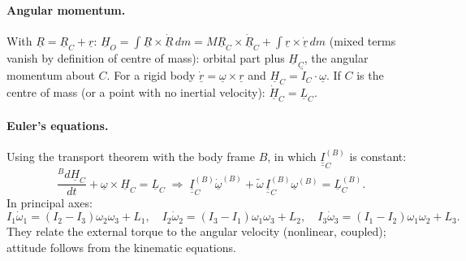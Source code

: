 \paragraph{Angular momentum.} With $\underline R=\underline R_C+\underline r$: $\underline H_O=\int\underline R\times\dot{\underline R}\,dm=M\underline R_C\times\dot{\underline R}_C+\int\underline r\times\dot{\underline r}\,dm$
(mixed terms vanish by definition of centre of mass): orbital part plus $\underline H_C$, the angular momentum about $C$. For a rigid body
$\dot{\underline r}=\underline\omega\times\underline r$ and $\underline H_C=\underrightarrow I_C\cdot\underline\omega$. If $C$ is the centre of mass (or a point with no inertial
velocity): $\dot{\underline H}_C=\underline L_C$.
\paragraph{Euler's equations.} Using the transport theorem with the body frame $B$, in which $\underline{\underline I}_C^{(B)}$ is constant:
\begin{equation}
\frac{{}^Bd\underline H_C}{dt}+\underline\omega\times\underline H_C=\underline L_C
\;\Longrightarrow\;
\underline{\underline I}_C^{(B)}\dot{\underline\omega}^{(B)}+\tilde\omega\,\underline{\underline I}_C^{(B)}\underline\omega^{(B)}=\underline L_C^{(B)}.
\end{equation}
In principal axes:
\begin{equation}
I_1\dot\omega_1=(I_2-I_3)\omega_2\omega_3+L_1,\quad I_2\dot\omega_2=(I_3-I_1)\omega_1\omega_3+L_2,\quad I_3\dot\omega_3=(I_1-I_2)\omega_1\omega_2+L_3 .
\end{equation}
They relate the external torque to the angular velocity (nonlinear, coupled); attitude follows from the kinematic equations.

